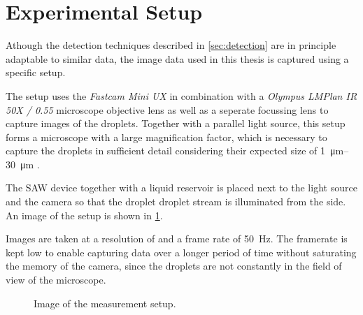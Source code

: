 \section{Experimental Setup}
\label{sec:setup}

Athough the detection techniques described in \ref{sec:detection} are in principle adaptable to similar data, the image data used in this thesis is captured using a specific setup. 

The setup uses the \emph{Fastcam Mini UX} in combination with a \emph{Olympus LMPlan IR 50X / 0.55} microscope objective lens as well as a seperate focussing lens to capture images of the droplets.
Together with a parallel light source, this setup forms a microscope with a large magnification factor, which is necessary to capture the droplets in sufficient detail considering their expected size of \SIrange{1}{30}{\micro\meter} \cite{kapplAkustischInduzierteVernebelung2022}.

The SAW device together with a liquid reservoir is placed next to the light source and the camera so that the droplet droplet stream is illuminated from the side. An image of the setup is shown in \ref{fig:setup}.

Images are taken at a resolution of  and a frame rate of \SI{50}{\hertz}. The framerate is kept low to enable capturing data over a longer period of time without saturating the memory of the camera, since the droplets are not constantly in the field of view of the microscope. 

\begin{figure}[htbp]
    \centering
    \caption{Image of the measurement setup.}
    \label{fig:setup}
\end{figure}